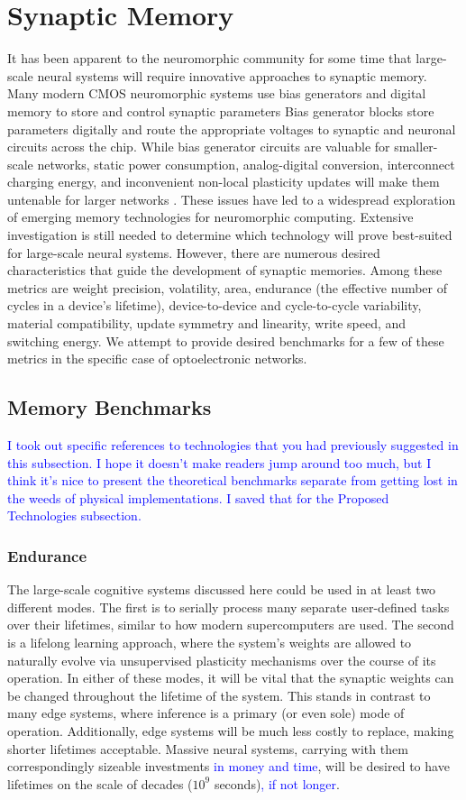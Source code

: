 \documentclass[twocolumn]{article}
\begin{document}
\section{\label{sec:memory}Synaptic Memory}
It has been apparent to the neuromorphic community for some time that large-scale neural systems will require innovative approaches to synaptic memory. Many modern CMOS neuromorphic systems use bias generators and digital memory to store and control synaptic parameters \cite{liu2014event} Bias generator blocks store parameters digitally and route the appropriate voltages to synaptic and neuronal circuits across the chip. While bias generator circuits are valuable for smaller-scale networks, static power consumption, analog-digital conversion, interconnect charging energy, and inconvenient non-local plasticity updates will make them untenable for larger networks \cite{dalgaty2019hybrid}. These issues have led to a widespread exploration of emerging memory technologies for neuromorphic computing. Extensive investigation is still needed to determine which technology will prove best-suited for large-scale neural systems. However, there are numerous desired characteristics that guide the development of synaptic memories. Among these metrics are weight precision, volatility, area, endurance (the effective number of cycles in a device's lifetime), device-to-device and cycle-to-cycle variability, material compatibility, update symmetry and linearity, write speed, and switching energy. We attempt to provide desired benchmarks for a few of these metrics in the specific case of optoelectronic networks.
\subsection{Memory Benchmarks}

\textcolor{blue}{I took out specific references to technologies that you had previously suggested in this subsection. I hope it doesn't make readers jump around too much, but I think it's nice to present the theoretical benchmarks separate from getting lost in the weeds of physical implementations. I saved that for the Proposed Technologies subsection.}
\subsubsection{Endurance}
The large-scale cognitive systems discussed here could be used in at least two different modes. The first is to serially process many separate user-defined tasks over their lifetimes, similar to how modern supercomputers are used. The second is a lifelong learning approach, where the system's weights are allowed to naturally evolve via unsupervised plasticity mechanisms over the course of its operation. In either of these modes, it will be vital that the synaptic weights can be changed throughout the lifetime of the system. This stands in contrast to many edge systems, where inference is a primary (or even sole) mode of operation. Additionally, edge systems will be much less costly to replace, making shorter lifetimes acceptable. Massive neural systems, carrying with them correspondingly sizeable investments \textcolor{blue}{in money and time}, will be desired to have lifetimes on the scale of decades ($10^9$ seconds)\textcolor{blue}{, if not longer}.
\end{document}
